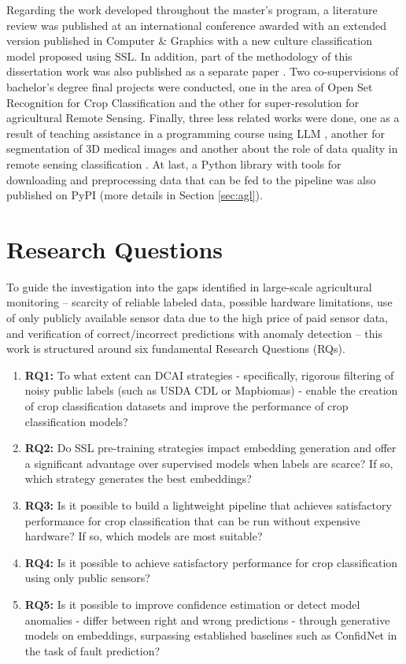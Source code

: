 Regarding the work developed throughout the master's program, a literature review was published at an international conference \citep{mateuzin2024} awarded with an extended version published in Computer \& Graphics \citep{daSilva2025} with a new culture classification model proposed using \ac{SSL}. In addition, part of the methodology of this dissertation work was also published as a separate paper \citep{pintodasilva2025lightweight}. Two co-supervisions of bachelor's degree final projects were conducted, one in the area of Open Set Recognition for Crop Classification and the other for super-resolution for agricultural Remote Sensing. Finally, three less related works were done, one as a result of teaching assistance in a programming course using \ac{LLM} \citep{alcantara2025assessing}, another for segmentation of 3D medical images \citep{Oliveira2025} and another about the role of data quality in remote sensing classification \citep{Correa2026rethinking}. At last, a Python library with tools for downloading and preprocessing data that can be fed to the pipeline was also published on PyPI (more details in Section \ref{sec:agl}).

\section{Research Questions}

To guide the investigation into the gaps identified in large-scale agricultural monitoring – scarcity of reliable labeled data, possible hardware limitations, use of only publicly available sensor data due to the high price of paid sensor data, and verification of correct/incorrect predictions with anomaly detection – this work is structured around six fundamental Research Questions (RQs).

\begin{enumerate}
    \item \textbf{RQ1:} To what extent can DCAI strategies - specifically, rigorous filtering of noisy public labels (such as USDA CDL or Mapbiomas) - enable the creation of crop classification datasets and improve the performance of crop classification models?
    \item \textbf{RQ2:} Do SSL pre-training strategies impact embedding generation and offer a significant advantage over supervised models when labels are scarce? If so, which strategy generates the best embeddings?
    \item \textbf{RQ3:} Is it possible to build a lightweight pipeline that achieves satisfactory performance for crop classification that can be run without expensive hardware? If so, which models are most suitable?
    \item \textbf{RQ4:} Is it possible to achieve satisfactory performance for crop classification using only public sensors?
    \item \textbf{RQ5:} Is it possible to improve confidence estimation or detect model anomalies - differ between right and wrong predictions - through generative models on embeddings, surpassing established baselines such as ConfidNet \citep{corbiere2019addressing} in the task of fault prediction?
\end{enumerate}

